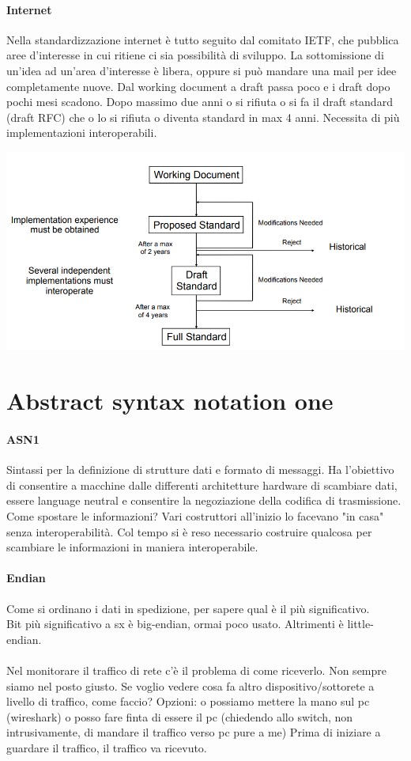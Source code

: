 \documentclass[10pt]{book}
\begin{document}
\paragraph{Internet} Nella standardizzazione internet è tutto seguito dal comitato IETF, che pubblica aree d'interesse in cui ritiene ci sia possibilità di sviluppo. La sottomissione di un'idea ad un'area d'interesse è libera, oppure si può mandare una mail per idee completamente nuove. Dal working document a draft passa poco e i draft dopo pochi mesi scadono. Dopo massimo due anni o si rifiuta o si fa il draft standard (draft RFC) che o lo si rifiuta o diventa standard in max 4 anni. Necessita di più implementazioni interoperabili.
\begin{center}
	\includegraphics[scale=0.7]{stdietf.png}
\end{center}
\section{Abstract syntax notation one}
\paragraph{ASN1} Sintassi per la definizione di strutture dati e formato di messaggi. Ha l'obiettivo di consentire a macchine dalle differenti architetture hardware di scambiare dati, essere language neutral e consentire la negoziazione della codifica di trasmissione.\\
Come spostare le informazioni? Vari costruttori all'inizio lo facevano "in casa" senza interoperabilità. Col tempo si è reso necessario costruire qualcosa per scambiare le informazioni in maniera interoperabile.
\paragraph{Endian} Come si ordinano i dati in spedizione, per sapere qual è il più significativo.\\
Bit più significativo a sx è big-endian, ormai poco usato. Altrimenti è little-endian.\\\\
Nel monitorare il traffico di rete c'è il problema di come riceverlo. Non sempre siamo nel posto giusto. Se voglio vedere cosa fa altro dispositivo/sottorete a livello di traffico, come faccio? Opzioni: o possiamo mettere la mano sul pc (wireshark) o posso fare finta di essere il pc (chiedendo allo switch, non intrusivamente, di mandare il traffico verso pc pure a me) Prima di iniziare a guardare il traffico, il traffico va ricevuto.\\
\end{document}
